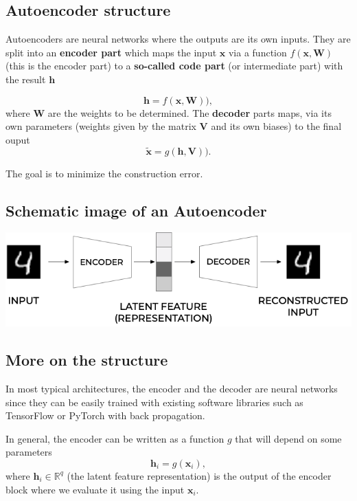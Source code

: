 \documentclass[%
oneside,                 %
final,                   %
10pt]{article}
\begin{document}
\subsection{Autoencoder structure}

Autoencoders are neural networks where the outputs are its own
inputs. They are split into an \textbf{encoder part}
which maps the input $\bm{x}$ via a function $f(\bm{x},\bm{W})$ (this
is the encoder part) to a \textbf{so-called code part} (or intermediate part)
with the result $\bm{h}$

\[
\bm{h} = f(\bm{x},\bm{W})),
\]
where $\bm{W}$ are the weights to be determined.  The \textbf{decoder} parts maps, via its own parameters (weights given by the matrix $\bm{V}$ and its own biases) to 
the final ouput
\[
\tilde{\bm{x}} = g(\bm{h},\bm{V})).
\]

The goal is to minimize the construction error.

\subsection{Schematic image of an Autoencoder}

\vspace{6mm}

\centerline{\includegraphics[width=1.0\linewidth]{figures/ae1.png}}

\vspace{6mm}

\subsection{More on the structure}

In most typical architectures, the encoder and the decoder are neural networks
since they can be easily trained with existing software libraries such as TensorFlow or PyTorch with back propagation.

In general, the encoder can be written as a function $g$ that will depend on some parameters
\[
\mathbf{h}_{i} = g(\mathbf{x}_{i}),
\]
where $\mathbf{h}_{i}\in\mathbb{R}^{q}$  (the latent feature representation) is the output of the encoder block where we evaluate
it using the input $\mathbf{x}_{i}$.
\end{document}
